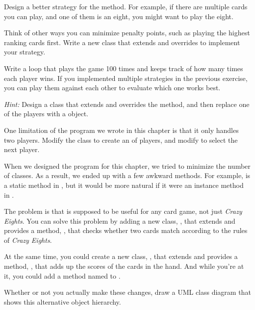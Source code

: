 \begin{exercise}
Design a better strategy for the  method.
For example, if there are multiple cards you can play, and one of them is an eight, you might want to play the eight.


Think of other ways you can minimize penalty points, such as playing the highest ranking cards first.
Write a new class that extends  and overrides  to implement your strategy.
\end{exercise}


\begin{exercise}
Write a loop that plays the game 100 times and keeps track of how many times each player wins.
If you implemented multiple strategies in the previous exercise, you can play them against each other to evaluate which one works best.

{\it Hint:} Design a  class that extends  and overrides the  method, and then replace one of the players with a  object.
\end{exercise}


\begin{exercise}
One limitation of the program we wrote in this chapter is that it only handles two players.
Modify the  class to create an  of players, and modify  to select the next player.
\end{exercise}


\begin{exercise}
When we designed the program for this chapter, we tried to minimize the number of classes.
As a result, we ended up with a few awkward methods.
For example,  is a static method in , but it would be more natural if it were an instance method in .

The problem is that  is supposed to be useful for any card game, not just {\it Crazy Eights}.
You can solve this problem by adding a new class, , that extends  and provides a method, , that checks whether two cards match according to the rules of {\it Crazy Eights}.

At the same time, you could create a new class, , that extends  and provides a method, , that adds up the scores of the cards in the hand.
And while you're at it, you could add a method named  to .

Whether or not you actually make these changes, draw a UML class diagram that shows this alternative object hierarchy.
\end{exercise}
